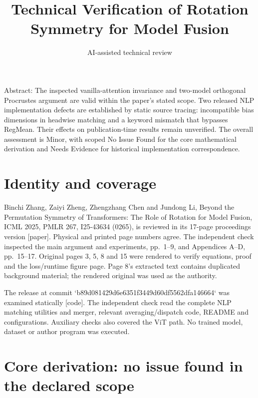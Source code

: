 \documentclass[10pt]{article}
\title{Technical Verification of Rotation Symmetry for Model Fusion}
\author{AI-assisted technical review}
\date{}
\begin{document}
\maketitle
Abstract: The inspected vanilla-attention invariance and two-model orthogonal Procrustes argument are valid within the paper’s stated scope. Two released NLP implementation defects are established by static source tracing: incompatible bias dimensions in headwise matching and a keyword mismatch that bypasses RegMean. Their effects on publication-time results remain unverified. The overall assessment is Minor, with scoped No Issue Found for the core mathematical derivation and Needs Evidence for historical implementation correspondence.\par
\section*{Identity and coverage}
Binchi Zhang, Zaiyi Zheng, Zhengzhang Chen and Jundong Li, Beyond the Permutation Symmetry of Transformers: The Role of Rotation for Model Fusion, ICML 2025, PMLR 267, I25-43634 (0265), is reviewed in its 17-page proceedings version [paper]. Physical and printed page numbers agree. The independent check inspected the main argument and experiments, pp. 1–9, and Appendices A–D, pp. 15–17. Original pages 3, 5, 8 and 15 were rendered to verify equations, proof and the loss/runtime figure page. Page 8’s extracted text contains duplicated background material; the rendered original was used as the authority.\par
The release at commit `b89d081429d6e6351f3449d60df5562dfa146664` was examined statically [code]. The independent check read the complete NLP matching utilities and merger, relevant averaging/dispatch code, README and configurations. Auxiliary checks also covered the ViT path. No trained model, dataset or author program was executed.\par
\section*{Core derivation: no issue found in the declared scope}
\end{document}
